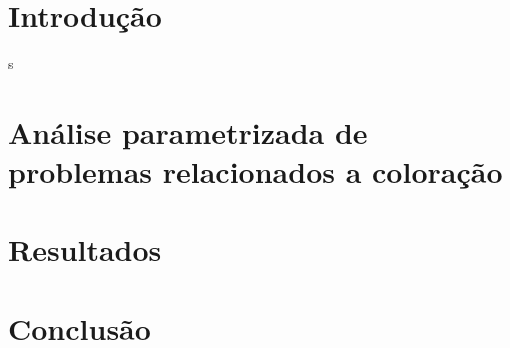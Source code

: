 \documentclass[a4paper,oneside,12pt]{book}
\begin{document}
\thispagestyle{myheadings}



\pagebreak
{}





\chapter{Introdução} \label{cap:introducao}s


\chapter{Análise parametrizada de problemas relacionados a coloração}
\chapter{Resultados}
\chapter{Conclusão}
\cleardoublepage
{}

%

\end{document}
